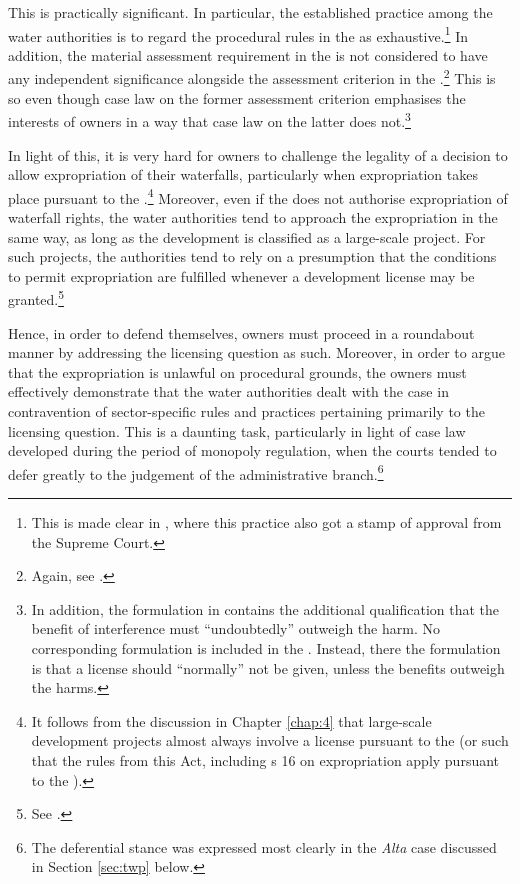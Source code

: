 This is practically significant. In particular, the established practice among the water authorities is to regard the procedural rules in the \cite{wra17} as exhaustive.\footnote{This is made clear in \cite{jorpeland11}, where this practice also got a stamp of approval from the Supreme Court.} In addition, the material assessment requirement in the \cite{ea59} is not considered to have any independent significance alongside the assessment criterion in the \cite{wra17}.\footnote{Again, see \cite{jorpeland11}.} This is so even though case law on the former assessment criterion emphasises the interests of owners in a way that case law on the latter does not.\footnote{In addition, the formulation in \cite[2]{ea59} contains the additional qualification that the benefit of interference must ``undoubtedly'' outweigh the harm. No corresponding formulation is included in the \cite[8]{wra17}. Instead, there the formulation is that a license should ``normally'' not be given, unless the benefits outweigh the harms.}


In light of this, it is very hard for owners to challenge the legality of a decision to allow expropriation of their waterfalls, particularly when expropriation takes place pursuant to the \cite{wra17}.\footnote{It follows from the discussion in Chapter \ref{chap:4} that large-scale development projects almost always involve a license pursuant to the \cite{wra17} (or such that the rules from this Act, including s 16 on expropriation apply pursuant to the \cite{wra00}).} Moreover, even if the \cite{wra17} does not authorise expropriation of waterfall rights, the water authorities tend to approach the expropriation in the same way, as long as the development is classified as a large-scale project. For such projects, the authorities tend to rely on a presumption that the conditions to permit expropriation are fulfilled whenever a development license may be granted.\footnote{See \cite{flatby08}.}

Hence, in order to defend themselves, owners must proceed in a roundabout manner by addressing the licensing question as such. Moreover, in order to argue that the expropriation is unlawful on procedural grounds, the owners must effectively demonstrate that the water authorities dealt with the case in contravention of sector-specific rules and practices pertaining primarily to the licensing question. This is a daunting task, particularly in light of case law developed during the period of monopoly regulation, when the courts tended to defer greatly to the judgement of the administrative branch.\footnote{The deferential stance was expressed most clearly in the {\it Alta} case discussed in Section \ref{sec:twp} below.}


